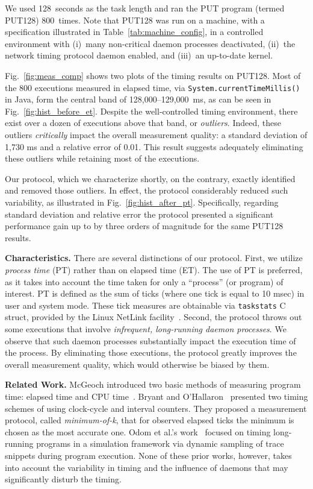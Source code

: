 \documentclass[letter]{ieice}
\begin{document}
We used 128~seconds as the task length and ran the PUT program (termed PUT128) 
800~times. {\color{red}Note that PUT128 was run on a machine, with 
a specification illustrated in Table~\ref{tab:machine_config}, 
in a controlled environment 
with (i)~many non-critical daemon processes deactivated, (ii)~the 
network timing protocol daemon enabled, and (iii)~an up-to-date kernel.} 
 
{\color{blue}Fig.~\ref{fig:meas_comp} shows two plots of the timing results on PUT128.
Most of the 800 executions measured in elapsed time, 
via  {\tt System.currentTimeMillis()} in Java, form the central band 
of \hbox{128,000--129,000 ms,} as can be seen in Fig.~\ref{fig:hist_before_et}. 
Despite the well-controlled timing environment, there exist over a dozen of executions above that band, or {\em outliers}. Indeed, these outliers {\em critically} impact the overall measurement quality: a standard deviation of 1,730 ms and a relative error of 0.01. This result suggests adequately eliminating these outliers while retaining most of the executions.}

{\color{blue}
Our protocol, which we characterize shortly, on the contrary, 
exactly identified and removed those outliers. 
In effect, the protocol considerably reduced such variability, 
as illustrated in Fig.~\ref{fig:hist_after_pt}. 
Specifically, regarding standard deviation and relative error 
the protocol presented a significant performance gain up to by 
three orders of magnitude for the same PUT128 results.
}

{\color{red}
{\bf Characteristics.} There are several distinctions of our protocol. 
First, we utilize {\em process time} (PT) rather than on elapsed time (ET). 
The use of PT is preferred, as it takes into account 
the time taken for only a ``process'' (or program) of interest.
PT is defined as the sum of ticks (where one tick is equal to 10 msec)
in user and system mode. 
These tick measures are obtainable via {\tt taskstats} C struct, 
provided by the Linux NetLink facility~\cite{Netlink}. 
Second, the protocol throws out some executions that involve
{\em infrequent, \hbox{long-running} daemon processes}. 
We observe that such daemon processes substantially impact 
the execution time of the process.  
By eliminating those executions, the protocol greatly improves
the overall measurement quality, which would otherwise be biased by them.
}

{\bf Related Work.} 
McGeoch introduced
two basic methods of measuring program time: elapsed time and CPU time~\cite{Mcgeoch12}. 
Bryant and O'Hallaron~\cite{Randal03} 
presented two timing schemes of using clock-cycle and interval counters. 
They proposed a measurement protocol, called {\em minimum-of-k}, 
that for observed elapsed ticks the minimum is chosen as the most accurate one. 
Odom et al.'s work~\cite{Odom05} focused on timing long-running programs 
in a simulation framework via dynamic sampling of trace snippets during program execution. 
None of these prior works, however, takes into account the variability in 
timing and the influence of daemons that may significantly disturb the timing.
\end{document}
